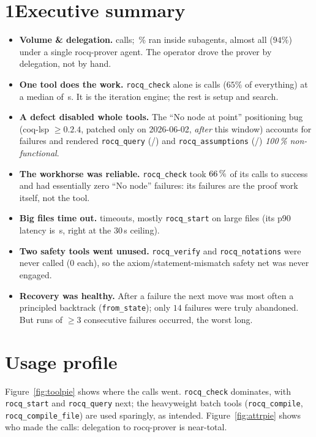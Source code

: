\documentclass[11pt]{article}
\newcommand{\tl}[1]{\texttt{#1}}
\newcommand{\rstart}{\tl{rocq\_start}}
\newcommand{\rcheck}{\tl{rocq\_check}}
\newcommand{\rquery}{\tl{rocq\_query}}
\newcommand{\rcompile}{\tl{rocq\_compile}}
\newcommand{\rcompilef}{\tl{rocq\_compile\_file}}
\newcommand{\rverify}{\tl{rocq\_verify}}
\newcommand{\rassum}{\tl{rocq\_assumptions}}
\newcommand{\rnot}{\tl{rocq\_notations}}
\begin{document}
\section*{1\quad Executive summary}
\begin{itemize}[leftmargin=1.4em,itemsep=2pt]
\item \textbf{Volume \& delegation.} \Ntotal{} calls; \Subpct\,\% ran inside
subagents, almost all (\(94\%\)) under a single \textsf{rocq-prover} agent. The
operator drove the prover by delegation, not by hand.
\item \textbf{One tool does the work.} \rcheck{} alone is \Checkn{} calls
(\(65\%\) of everything) at a median of \Checkmed\,s. It is the iteration engine;
the rest is setup and search.
\item \textbf{A defect disabled whole tools.} The ``No node at point'' positioning
bug (coq-lsp \(\ge 0.2.4\), patched only on 2026-06-02, \emph{after} this window)
accounts for \Nnode{} failures and rendered \rquery{} (\Qbroken/\Qtotal) and
\rassum{} (\Asmbroken/\Asmtotal) \emph{100\,\% non-functional}.
\item \textbf{The workhorse was reliable.} \rcheck{} took \(66\,\%\) of its
calls to success and had essentially zero ``No node'' failures: its failures are
the proof work itself, not the tool.
\item \textbf{Big files time out.} \Ntimeout{} timeouts, mostly \rstart{} on large
files (its p90 latency is \Startptimeout\,s, right at the 30\,s ceiling).
\item \textbf{Two safety tools went unused.} \rverify{} and \rnot{} were never
called (0 each), so the axiom/statement-mismatch safety net was never engaged.
\item \textbf{Recovery was healthy.} After a failure the next move was most often a
principled backtrack (\texttt{from\_state}); only \(14\) failures were truly
abandoned. But \Stuckcount{} runs of \(\ge 3\) consecutive failures occurred, the
worst \Stuckmax{} long.
\end{itemize}

\section{Usage profile}
Figure~\ref{fig:toolpie} shows where the calls went. \rcheck{} dominates, with
\rstart{} and \rquery{} next; the heavyweight batch tools (\rcompile,
\rcompilef) are used sparingly, as intended. Figure~\ref{fig:attrpie} shows who
made the calls: delegation to \textsf{rocq-prover} is near-total.
\end{document}

